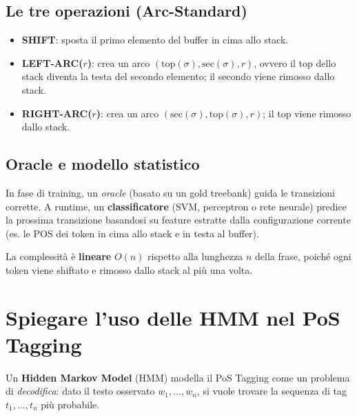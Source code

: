\documentclass[12pt,a4paper]{article}
\begin{document}
\subsection{Le tre operazioni (Arc-Standard)}

\begin{defbox}
\begin{itemize}[leftmargin=1.5em]
  \item \textbf{SHIFT}: sposta il primo elemento del buffer in cima allo stack.
  \item \textbf{LEFT-ARC($r$)}: crea un arco $(\text{top}(\sigma), \text{sec}(\sigma), r)$, ovvero il top dello stack diventa la testa del secondo elemento; il secondo viene rimosso dallo stack.
  \item \textbf{RIGHT-ARC($r$)}: crea un arco $(\text{sec}(\sigma), \text{top}(\sigma), r)$; il top viene rimosso dallo stack.
\end{itemize}
\end{defbox}

\subsection{Oracle e modello statistico}
In fase di training, un \emph{oracle} (basato su un gold treebank) guida le transizioni corrette. A runtime, un \textbf{classificatore} (SVM, perceptron o rete neurale) predice la prossima transizione basandosi su feature estratte dalla configurazione corrente (es. le POS dei token in cima allo stack e in testa al buffer).

La complessità è \textbf{lineare} $O(n)$ rispetto alla lunghezza $n$ della frase, poiché ogni token viene shiftato e rimosso dallo stack al più una volta.

\section{Spiegare l'uso delle HMM nel PoS Tagging}

Un \textbf{Hidden Markov Model} (HMM) modella il PoS Tagging come un problema di \emph{decodifica}: dato il testo osservato $w_1, \dots, w_n$, si vuole trovare la sequenza di tag $t_1, \dots, t_n$ più probabile.
\end{document}
